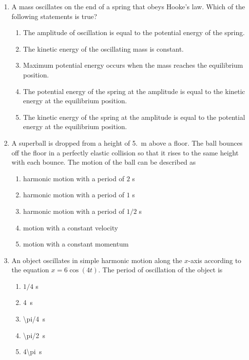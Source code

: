 \documentclass{../../../oss-apphys}
\begin{document}
\genheader


\genmultidirections

\gengravity

\raggedcolumns
\begin{multicols}{2}
  \begin{enumerate}[leftmargin=18pt]

  \item A mass oscillates on the end of a spring that obeys Hooke's law. Which
    of the following statements is true?
    \begin{enumerate}[noitemsep,topsep=0pt,leftmargin=18pt,label=(\Alph*)]
    \item The amplitude of oscillation is equal to the potential energy of the
      spring.
    \item The kinetic energy of the oscillating mass is constant.
    \item Maximum potential energy occurs when the mass reaches the
      equilibrium position.
    \item The potential energy of the spring at the amplitude is equal to the
      kinetic energy at the equilibrium position.
    \item The kinetic energy of the spring at the amplitude is equal to the
      potential energy at the equilibrium position.
    \end{enumerate}

  \item A superball is dropped from a height of \SI{5.}{\metre} above a floor.
    The ball bounces off the floor in a perfectly elastic collision so that it
    rises to the same height with each bounce. The motion of the ball can be
    described as
    \begin{enumerate}[noitemsep,topsep=0pt,leftmargin=18pt,label=(\Alph*)]
    \item harmonic motion with a period of $2$ \si{\second}
    \item harmonic motion with a period of $1$ \si{\second}
    \item harmonic motion with a period of $1/2$ \si{\second}
    \item motion with a constant velocity
    \item motion with a constant momentum
    \end{enumerate}

  \item An object oscillates in simple harmonic motion along the $x$-axis
    according to the equation $x = 6 \cos(4t)$. The period of oscillation of the
    object is
    \begin{enumerate}[noitemsep,topsep=0pt,leftmargin=18pt,label=(\Alph*)]
    \item $1/4$ \si{\second}
    \item\SI{4}{\second}
    \item\SI{\pi/4}{\second}
    \item\SI{\pi/2}{\second}
    \item\SI{4\pi}{\second}
    \end{enumerate}
    \columnbreak
    

\end{enumerate}
\end{multicols}
\end{document}

